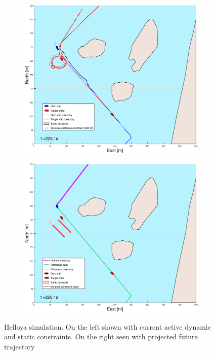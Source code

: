 \begin{figure}[ht]
\begin{subfigure}[b]{0.499\textwidth}
    \end{subfigure}
    \hfill
    \\
    \begin{subfigure}[b]{0.49\textwidth}
        \centering
        \includegraphics[width=\textwidth]{Images/Figures/Helloya/_Simple_0fig1_time=226}
    \end{subfigure}
    \hfill
    \begin{subfigure}[b]{0.499\textwidth}
        \centering
        \includegraphics[width=\textwidth]{Images/Figures/Helloya/_Simple_0fig999_time=226}
    \end{subfigure}
    \hfill
    \caption{Helloya simulation. On the left shown with current active dynamic and static constraints. On the right seen with projected future trajectory}
\end{figure}

